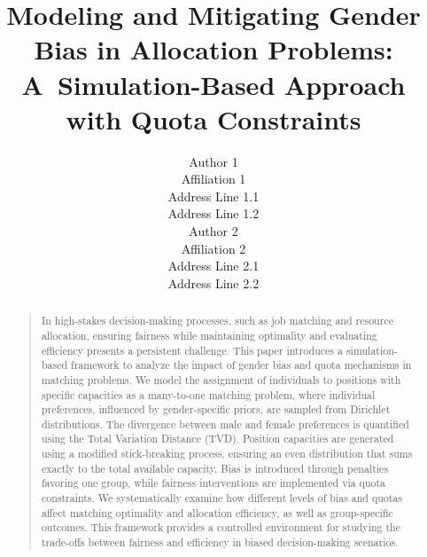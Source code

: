 \documentclass[letterpaper]{article}
\begin{document}
\title{Modeling and Mitigating Gender Bias in Allocation Problems: A~Simulation-Based Approach with Quota Constraints}
\author{Author 1\\
Affiliation 1\\
Address Line 1.1\\
Address Line 1.2\\
\And Author 2\\
Affiliation 2\\
Address Line 2.1\\
Address Line 2.2\\
}


\maketitle
\begin{abstract}
\begin{quote}
In high-stakes decision-making processes, such as job matching and resource allocation, ensuring fairness while maintaining optimality and evaluating efficiency presents a persistent challenge. This paper introduces a simulation-based framework to analyze the impact of gender bias and quota mechanisms in matching problems. We model the assignment of individuals to positions with specific capacities as a many-to-one matching problem, where individual preferences, influenced by gender-specific priors, are sampled from Dirichlet distributions. The divergence between male and female preferences is quantified using the Total Variation Distance (TVD). Position capacities are generated using a modified stick-breaking process, ensuring an even distribution that sums exactly to the total available capacity. Bias is introduced through penalties favoring one group, while fairness interventions are implemented via quota constraints. We systematically examine how different levels of bias and quotas affect matching optimality and allocation efficiency, as well as group-specific outcomes. This framework provides a controlled environment for studying the trade-offs between fairness and efficiency in biased decision-making scenarios.
\end{quote}
\end{abstract}
\end{document}

